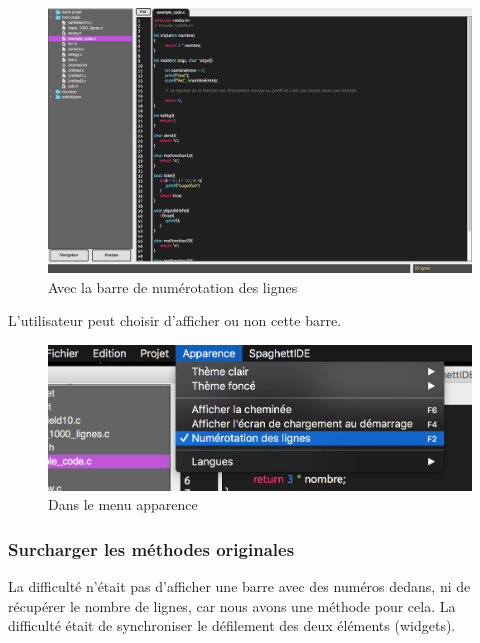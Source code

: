 \documentclass[a4paper,12pt]{article}
\begin{document}
		\begin{figure}[h!]
			\begin{center}
				\includegraphics[scale=0.25]{images/imgs_lines/apres}
				\caption{Avec la barre de numérotation des lignes}
			\end{center}
		\end{figure}
		
		\newpage
		
	L'utilisateur peut choisir d'afficher ou non cette barre.
	
		\begin{figure}[h!]
			\begin{center}
				\includegraphics[scale=0.8]{images/imgs_lines/menu}
				\caption{Dans le menu apparence}
			\end{center}
		\end{figure}
		
		\subsubsection{Surcharger les méthodes originales}

	La difficulté n'était pas d'afficher une barre avec des numéros dedans, ni de récupérer le nombre de lignes, car nous avons une méthode pour cela. La difficulté était de synchroniser le défilement des deux éléments (widgets).\\
		
\end{document}
